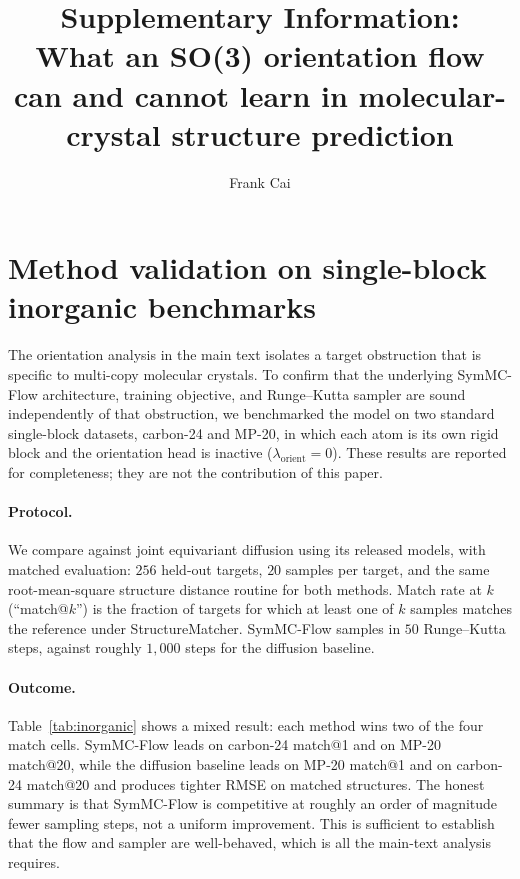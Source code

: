 \documentclass[11pt]{article}
\title{\bfseries Supplementary Information:\\
What an SO(3) orientation flow can and cannot learn in
molecular-crystal structure prediction}
\author{Frank Cai}
\date{}
\begin{document}
\maketitle

\section{Method validation on single-block inorganic benchmarks}

The orientation analysis in the main text isolates a target obstruction that is
specific to multi-copy molecular crystals. To confirm that the underlying
SymMC-Flow architecture, training objective, and Runge--Kutta sampler are sound
independently of that obstruction, we benchmarked the model on two standard
single-block datasets, carbon-24 and MP-20, in which each atom is its own rigid
block and the orientation head is inactive ($\lambda_{\text{orient}}=0$). These
results are reported for completeness; they are not the contribution of this
paper.

\paragraph{Protocol.} We compare against joint equivariant
diffusion\cite{jiao2023diffcsp} using its released models, with matched
evaluation: $256$ held-out targets, $20$ samples per target, and the same
root-mean-square structure distance routine for both methods. Match rate at $k$
(``match@$k$'') is the fraction of targets for which at least one of $k$ samples
matches the reference under StructureMatcher\cite{ong2013pymatgen}. SymMC-Flow
samples in $50$ Runge--Kutta steps, against roughly $1{,}000$ steps for the
diffusion baseline.

\paragraph{Outcome.} Table~\ref{tab:inorganic} shows a mixed result: each method
wins two of the four match cells. SymMC-Flow leads on carbon-24 match@1 and on
MP-20 match@20, while the diffusion baseline leads on MP-20 match@1 and on
carbon-24 match@20 and produces tighter RMSE on matched structures. The honest
summary is that SymMC-Flow is competitive at roughly an order of magnitude fewer
sampling steps, not a uniform improvement. This is sufficient to establish that
the flow and sampler are well-behaved, which is all the main-text analysis
requires.
\end{document}
